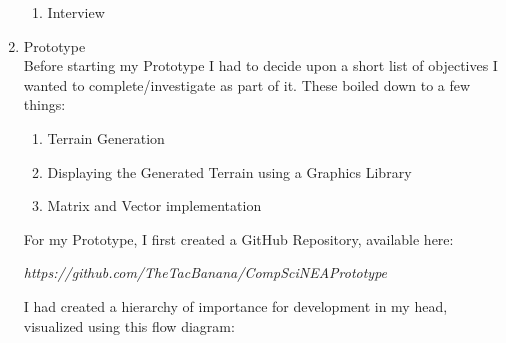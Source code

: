 \begin{flushleft}
\begin{enumerate}
\begin{enumerate}
                \item {\Large Interview} \\
                    \large
                    \vspace{0.2cm}
            \end{enumerate}

            \pagebreak
        \item {\Large Prototype} \\
            \large
            \vspace{0.2cm}
            Before starting my Prototype I had to decide upon a short list of objectives I wanted to 
            complete/investigate as part of it. These boiled down to a few things:

            \vspace{0.2cm}
            \begin{enumerate}
                \item Terrain Generation
                \item Displaying the Generated Terrain using a Graphics Library
                \item Matrix and Vector implementation
            \end{enumerate}
            \vspace{0.2cm}

            For my Prototype, I first created a GitHub Repository, available here: 
            
            \vspace{0.1cm}
            \centerline{\textit{https://github.com/TheTacBanana/CompSciNEAPrototype}}
            \vspace{0.1cm}

            I had created a hierarchy of importance for development in my head, visualized using this flow diagram:


\end{enumerate}
\end{flushleft}

